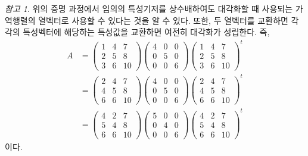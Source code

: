 \documentclass[unfonts,oneside,a4paper]{oblivoir}
\theoremstyle{definition}
\theoremstyle{theorem}
\theoremstyle{theorem}
\theoremstyle{remark}
\newtheorem*{remark}{참고}
\theoremstyle{remark}
\theoremstyle{remark}
\theoremstyle{remark}
\begin{document}
\begin{remark}
    위의 증명 과정에서 임의의 특성기저를 상수배하여도 대각화할 때 사용되는 가역행렬의 열벡터로 사용할 수 있다는 것을 알 수 있다.
    또한, 두 열벡터를 교환하면 각각의 특성벡터에 해당하는 특성값을 교환하면 여전히 대각화가 성립한다.
    즉,
    \begin{align*}
        A &=
        \begin{pmatrix}
            1 & 4 & 7\\
            2 & 5 & 8\\
            3 & 6 & 10
        \end{pmatrix}
        \begin{pmatrix}
            4 & 0 & 0\\
            0 & 5 & 0\\
            0 & 0 & 6
        \end{pmatrix}
        \begin{pmatrix}
            1 & 4 & 7\\
            2 & 5 & 8\\
            3 & 6 & 10
        \end{pmatrix}^t\\
          &=
        \begin{pmatrix}
            2 & 4 & 7\\
            4 & 5 & 8\\
            6 & 6 & 10
        \end{pmatrix}
        \begin{pmatrix}
            4 & 0 & 0\\
            0 & 5 & 0\\
            0 & 0 & 6
        \end{pmatrix}
        \begin{pmatrix}
            2 & 4 & 7\\
            4 & 5 & 8\\
            6 & 6 & 10
        \end{pmatrix}^t\\
          &=
        \begin{pmatrix}
            4 & 2 & 7\\
            5 & 4 & 8\\
            6 & 6 & 10
        \end{pmatrix}
        \begin{pmatrix}
            5 & 0 & 0\\
            0 & 4 & 0\\
            0 & 0 & 6
        \end{pmatrix}
        \begin{pmatrix}
            4 & 2 & 7\\
            5 & 4 & 8\\
            6 & 6 & 10
        \end{pmatrix}^t
    \end{align*}
    이다.
\end{remark}
\end{document}
